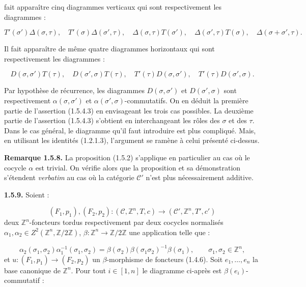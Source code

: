 %
fait apparaître cinq diagrammes verticaux qui sont respectivement les
diagrammes :

\[
  T'(\sigma')\Delta(\sigma,\tau),\quad
  T'(\sigma)\Delta(\sigma',\tau),\quad
  \Delta(\sigma,\tau)T(\sigma'),\quad
  \Delta(\sigma',\tau)T(\sigma),\quad
  \Delta(\sigma+\sigma',\tau).
\]

Il fait apparaître de même quatre diagrammes horizontaux qui sont
respectivement les diagrammes :

\[
  D(\sigma,\sigma')T(\tau),\quad
  D(\sigma',\sigma)T(\tau),\quad
  T'(\tau)D(\sigma,\sigma'),\quad
  T'(\tau)D(\sigma',\sigma).
\]

Par hypothèse de récurrence, les diagrammes $D(\sigma,\sigma')$ et
$D(\sigma',\sigma)$ sont respectivement $\alpha(\sigma,\sigma')$ et
$\alpha(\sigma',\sigma)$-commutatifs. On en déduit la première partie
de l'assertion (1.5.4.3) en envisageant les trois cas possibles. La
deuxième partie de l'assertion (1.5.4.3) s'obtient en interchangeant les
rôles des $\sigma$ et des $\tau$. Dans le cas général, le diagramme
qu'il faut introduire est plus compliqué. Mais, en utilisant les
identités (1.2.1.3), l'argument se ramène à celui présenté ci-dessus.

\noindent\textbf{Remarque 1.5.8.}\quad
La proposition (1.5.2) s'applique en particulier au cas où le cocycle
$\alpha$ est trivial. On vérifie alors que la proposition et sa
démonstration s'étendent \emph{verbatim} au cas où la catégorie
$\mathcal C'$ n'est plus nécessairement additive.

\noindent\textbf{1.5.9.}\quad
Soient :

\[
  (F_1,p_1),(F_2,p_2)\colon
  (\mathcal C,\mathbb Z^n,T,c)
  \longrightarrow
  (\mathcal C',\mathbb Z^n,T',c')
\]
deux $\mathbb Z^n$-foncteurs tordus respectivement par deux cocycles
normalisés $\alpha_1,\alpha_2\in
Z^2(\mathbb Z^n,\mathbb Z/2\mathbb Z)$,
$\beta\colon\mathbb Z^n\to\mathbb Z/2\mathbb Z$ une application
telle que :

\begin{equation}
  \alpha_2(\sigma_1,\sigma_2)\alpha_1^{-1}(\sigma_1,\sigma_2)
  =\beta(\sigma_2)\beta(\sigma_1\sigma_2)^{-1}\beta(\sigma_1),
  \qquad \sigma_1,\sigma_2\in\mathbb Z^n,
  \tag{1.5.9.1}
\end{equation}
et $u\colon(F_1,p_1)\to(F_2,p_2)$ un $\beta$-morphisme de foncteurs
(1.4.6). Soit $e_1,\ldots,e_n$ la base canonique de $\mathbb Z^n$.
Pour tout $i\in[1,n]$ le diagramme ci-après est
$\beta(e_i)$-commutatif :

